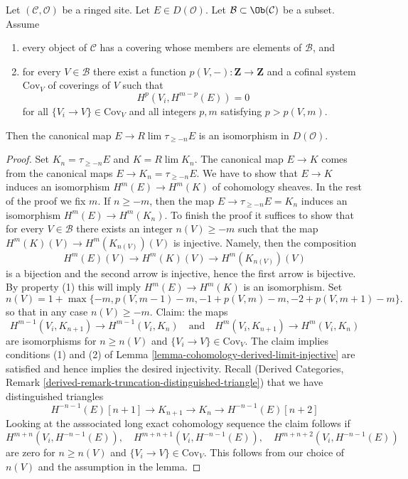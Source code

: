 \begin{lemma}
\label{lemma-is-limit-per-object}
Let $(\mathcal{C}, \mathcal{O})$ be a ringed site. Let $E \in D(\mathcal{O})$.
Let $\mathcal{B} \subset \Ob(\mathcal{C})$ be a subset. Assume
\begin{enumerate}
\item every object of $\mathcal{C}$ has a covering whose members
are elements of $\mathcal{B}$, and
\item for every $V \in \mathcal{B}$ there exist a function
$p(V, -) : \mathbf{Z} \to \mathbf{Z}$ and a cofinal system $\text{Cov}_V$
of coverings of $V$ such that
$$
H^p(V_i, H^{m - p}(E)) = 0
$$
for all $\{V_i \to V\} \in \text{Cov}_V$ and all integers $p, m$
satisfying $p > p(V, m)$.
\end{enumerate}
Then the canonical map $E \to R\lim \tau_{\geq -n} E$
is an isomorphism in $D(\mathcal{O})$.
\end{lemma}

\begin{proof}
Set $K_n = \tau_{\geq -n}E$ and $K = R\lim K_n$.
The canonical map $E \to K$
comes from the canonical maps $E \to K_n = \tau_{\geq -n}E$.
We have to show that $E \to K$ induces an isomorphism
$H^m(E) \to H^m(K)$ of cohomology sheaves. In the rest of the
proof we fix $m$. If $n \geq -m$, then
the map $E \to \tau_{\geq -n}E = K_n$ induces an isomorphism
$H^m(E) \to H^m(K_n)$.
To finish the proof it suffices to show that for every $V \in \mathcal{B}$
there exists an integer $n(V) \geq -m$ such that the map
$H^m(K)(V) \to H^m(K_{n(V)})(V)$ is injective. Namely, then
the composition
$$
H^m(E)(V) \to H^m(K)(V) \to H^m(K_{n(V)})(V)
$$
is a bijection and the second arrow is injective, hence the
first arrow is bijective. By property (1) this will imply
$H^m(E) \to H^m(K)$ is an isomorphism. Set
$$
n(V) = 1 + \max\{-m, p(V, m - 1) - m, -1 + p(V, m) - m, -2 + p(V, m + 1) - m\}.
$$
so that in any case $n(V) \geq -m$. Claim: the maps
$$
H^{m - 1}(V_i, K_{n + 1}) \to H^{m - 1}(V_i, K_n)
\quad\text{and}\quad
H^m(V_i, K_{n + 1}) \to H^m(V_i, K_n)
$$
are isomorphisms for $n \geq n(V)$ and $\{V_i \to V\} \in \text{Cov}_V$.
The claim implies conditions
(1) and (2) of Lemma \ref{lemma-cohomology-derived-limit-injective}
are satisfied and hence implies the desired injectivity.
Recall (Derived Categories, Remark
\ref{derived-remark-truncation-distinguished-triangle})
that we have distinguished triangles
$$
H^{-n - 1}(E)[n + 1] \to
K_{n + 1} \to K_n \to H^{-n - 1}(E)[n + 2]
$$
Looking at the asssociated long exact cohomology sequence the claim follows if
$$
H^{m + n}(V_i, H^{-n - 1}(E)),\quad
H^{m + n + 1}(V_i, H^{-n - 1}(E)),\quad
H^{m + n + 2}(V_i, H^{-n - 1}(E))
$$
are zero for $n \geq n(V)$ and $\{V_i \to V\} \in \text{Cov}_V$.
This follows from our choice of $n(V)$
and the assumption in the lemma.
\end{proof}

